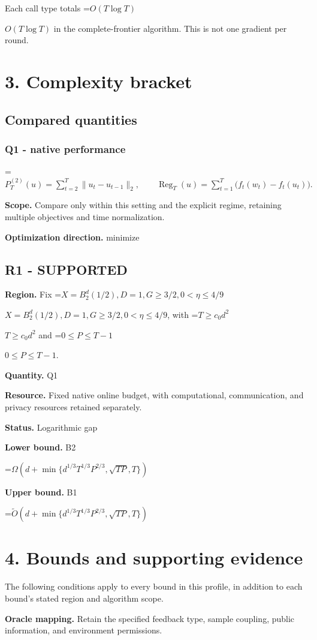 \documentclass[10pt,a4paper]{article}
\newcommand{\AtlasMath}[1]{\par\begingroup\centering\setbox0=\hbox{$\displaystyle #1$}\ifdim\wd0>1.4\linewidth\typeout{ATLAS WIDE FORMULA: \the\wd0}\fi\ifdim\wd0>\linewidth\resizebox{\linewidth}{!}{\box0}\else\box0\fi\par\endgroup}
\newcommand{\AtlasInlineMath}[1]{\begingroup\setbox0=\hbox{$#1$}\ifdim\wd0>.4\linewidth\endgroup\AtlasMath{#1}\else\endgroup$#1$\fi}
\begin{document}
Each call type totals \AtlasInlineMath{O(T\log T)} in the complete-frontier algorithm. This is not one gradient per round.

\section{3. Complexity bracket}
\subsection{Compared quantities}
\subsubsection{Q1 - native performance}
\AtlasMath{P_T^{(2)}(u)=\sum_{t=2}^{T}\|u_t-u_{t-1}\|_2,\qquad \operatorname{Reg}_T(u)=\sum_{t=1}^{T}\bigl(f_t(w_t)-f_t(u_t)\bigr).}
\textbf{Scope.} Compare only within this setting and the explicit regime, retaining multiple objectives and time normalization.

\textbf{Optimization direction.} minimize

\subsection{R1 - SUPPORTED}
\textbf{Region.} Fix \AtlasInlineMath{X=B_2^d(1/2),D=1,G\ge 3/2,0<\eta\le 4/9}, with \AtlasInlineMath{T\ge c_0d^{2}} and \AtlasInlineMath{0\le P\le T-1}.

\textbf{Quantity.} Q1

\textbf{Resource.} Fixed native online budget, with computational, communication, and privacy resources retained separately.

\textbf{Status.} Logarithmic gap

\textbf{Lower bound.} B2

\AtlasMath{\Omega(d+\min\{d^{1/3}T^{1/3}P^{2/3},\sqrt{TP},T\})}
\textbf{Upper bound.} B1

\AtlasMath{\widetilde{O}(d+\min\{d^{1/3}T^{1/3}P^{2/3},\sqrt{TP},T\})}
\section{4. Bounds and supporting evidence}
The following conditions apply to every bound in this profile, in addition to each bound's stated region and algorithm scope.

\textbf{Oracle mapping.} Retain the specified feedback type, sample coupling, public information, and environment permissions.
\end{document}
